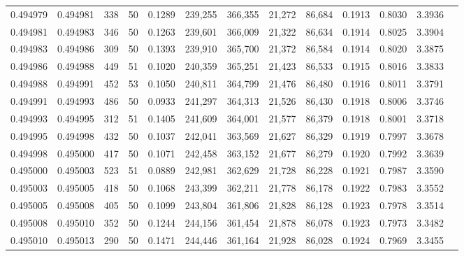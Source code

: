 \begin{tabular}{rrrrrrrrrrrrr}
0.494979 & 0.494981 &   338 &  50 &                                     0.1289 & 239,255 & 366,355 &  21,272 &  86,684 & 0.1913 & 0.8030 & 3.3936 \\
0.494981 & 0.494983 &   346 &  50 &                                     0.1263 & 239,601 & 366,009 &  21,322 &  86,634 & 0.1914 & 0.8025 & 3.3904 \\
0.494983 & 0.494986 &   309 &  50 &                                     0.1393 & 239,910 & 365,700 &  21,372 &  86,584 & 0.1914 & 0.8020 & 3.3875 \\
0.494986 & 0.494988 &   449 &  51 &                                     0.1020 & 240,359 & 365,251 &  21,423 &  86,533 & 0.1915 & 0.8016 & 3.3833 \\
0.494988 & 0.494991 &   452 &  53 &                                     0.1050 & 240,811 & 364,799 &  21,476 &  86,480 & 0.1916 & 0.8011 & 3.3791 \\
0.494991 & 0.494993 &   486 &  50 &                                     0.0933 & 241,297 & 364,313 &  21,526 &  86,430 & 0.1918 & 0.8006 & 3.3746 \\
0.494993 & 0.494995 &   312 &  51 &                                     0.1405 & 241,609 & 364,001 &  21,577 &  86,379 & 0.1918 & 0.8001 & 3.3718 \\
0.494995 & 0.494998 &   432 &  50 &                                     0.1037 & 242,041 & 363,569 &  21,627 &  86,329 & 0.1919 & 0.7997 & 3.3678 \\
0.494998 & 0.495000 &   417 &  50 &                                     0.1071 & 242,458 & 363,152 &  21,677 &  86,279 & 0.1920 & 0.7992 & 3.3639 \\
0.495000 & 0.495003 &   523 &  51 &                                     0.0889 & 242,981 & 362,629 &  21,728 &  86,228 & 0.1921 & 0.7987 & 3.3590 \\
0.495003 & 0.495005 &   418 &  50 &                                     0.1068 & 243,399 & 362,211 &  21,778 &  86,178 & 0.1922 & 0.7983 & 3.3552 \\
0.495005 & 0.495008 &   405 &  50 &                                     0.1099 & 243,804 & 361,806 &  21,828 &  86,128 & 0.1923 & 0.7978 & 3.3514 \\
0.495008 & 0.495010 &   352 &  50 &                                     0.1244 & 244,156 & 361,454 &  21,878 &  86,078 & 0.1923 & 0.7973 & 3.3482 \\
0.495010 & 0.495013 &   290 &  50 &                                     0.1471 & 244,446 & 361,164 &  21,928 &  86,028 & 0.1924 & 0.7969 & 3.3455 \\

\end{tabular}
